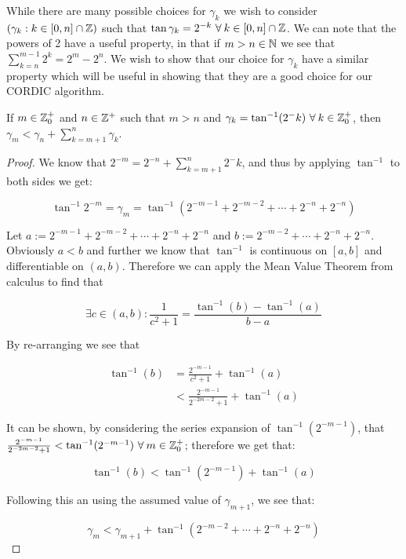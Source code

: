 {While there are many possible choices for \(\gamma_k\) we wish to consider \((\gamma_k : k \in [0, n] \cap \mathbb{Z})\) such that \(\tan \gamma_k = 2^{-k}\ \forall\: k \in [0,n] \cap \mathbb{Z}\). We can note that the powers of 2 have a useful property, in that if \(m > n \in \mathbb{N}\) we see that \(\sum_{k=n}^{m-1} 2^k = 2^m - 2^n\). We wish to show that our choice for \(\gamma_k\) have a similar property which will be useful in showing that they are a good choice for our CORDIC algorithm.

\begin{Cordic Gamma Property}
\label{THM_"Cordic Gamma Property"}
If \(m \in \mathbb{Z}^+_0\) and \(n \in \mathbb{Z}^+\) such that \(m > n\) and \(\gamma_k = \tan^{-1}(2^-k)\ \forall\: k \in \mathbb{Z}^+_0\), then \(\gamma_m < \gamma_n + \sum_{k=m+1}^n \gamma_k\).
\end{Cordic Gamma Property}
\begin{proof}
We know that \(2^{-m} = 2^{-n} + \sum_{k=m+1}^n 2^-k\), and thus by applying \(\tan^{-1}\) to both sides we get:

\[\tan^{-1} 2^{-m} = \gamma_m = \tan^{-1}(2^{-m-1} + 2^{-m-2} + \cdots + 2^{-n} + 2^{-n})\]

Let \(a := 2^{-m-1} + 2^{-m-2} + \cdots + 2^{-n} + 2^{-n}\) and \(b := 2^{-m-2} + \cdots + 2^{-n} + 2^{-n}\). Obviously \(a < b\) and further we know that \(\tan^{-1}\) is continuous on \([a,b]\) and differentiable on \((a,b)\). Therefore we can apply the Mean Value Theorem\cite{BOK_RealAnaly2} from calculus to find that 

\[\exists c \in (a,b) : \frac{1}{c^2 + 1} = \frac{\tan^{-1}(b) - \tan^{-1}(a)}{b-a}\]

By re-arranging we see that 

\begin{align*}
	\tan^{-1}(b) &= \frac{2^{-m-1}}{c^2 + 1} + \tan^{-1}(a)\\
		&< \frac{2^{-m-1}}{2^{-2m-2} + 1} + \tan^{-1}(a)
\end{align*}

It can be shown, by considering the series expansion of \(\tan^{-1}(2^{-m-1})\), that \(\frac{2^{-m-1}}{2^{-2m-2} + 1} < \tan^{-1}(2^{-m-1})\ \forall\: m \in \mathbb{Z}^+_0\); therefore we get that:

\[\tan^{-1}(b) < \tan^{-1}(2^{-m-1}) + \tan^{-1}(a)\]

Following this an using the assumed value of \(\gamma_{m+1}\), we see that:

\[\gamma_m < \gamma_{m+1} + \tan^{-1}(2^{-m-2} + \cdots + 2^{-n} + 2^{-n})\]


\end{proof}}
